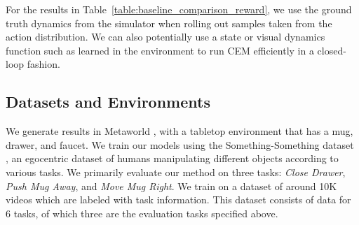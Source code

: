 For the results in Table~\ref{table:baseline_comparison_reward}, we use the ground truth dynamics from the simulator when rolling out samples taken from the action distribution. We can also potentially use a state or visual dynamics function such as \cite{hafner2019dreamer} learned in the environment to run CEM efficiently in a closed-loop fashion.


\subsection{Datasets and Environments}

We generate results in Metaworld \cite{metaworld}, with a tabletop environment that has a mug, drawer, and faucet. We train our models using the Something-Something dataset \cite{smthsmth}, an egocentric dataset of humans manipulating different objects according to various tasks. We primarily evaluate our method on three tasks: \textit{Close Drawer}, \textit{Push Mug Away}, and \textit{Move Mug Right}. We train on a dataset of around 10K videos which are labeled with task information. This dataset consists of data for 6 tasks, of which three are the evaluation tasks specified above.